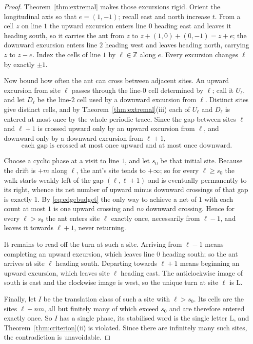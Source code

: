 \documentclass[11pt,letterpaper]{article}
\theoremstyle{plain}
\theoremstyle{definition}
\newcommand{\Z}{\mathbb{Z}}
\newcommand{\turnL}{\mathrm{L}}
\begin{document}
\begin{NoHyper}
\begin{proof}
Theorem~\ref{thm:extremal} makes those excursions rigid. Orient the longitudinal axis
so that $e=(1,-1)$; recall east and north increase $t$. From a cell $z$ on line $1$
the upward excursion
enters line $0$ heading east and leaves it heading south, so it carries the ant from
$z$ to $z+(1,0)+(0,-1)=z+e$; the downward excursion enters line $2$ heading west and
leaves heading north, carrying $z$ to $z-e$. Index the cells of line $1$ by
$\ell\in\Z$ along $e$. Every excursion changes $\ell$ by exactly $\pm1$.

Now bound how often the ant can cross between adjacent sites. An upward excursion
from site $\ell$ passes through the line-$0$ cell determined by $\ell$; call it
$U_\ell$, and let $D_\ell$ be the line-$2$ cell used by a downward excursion from
$\ell$. Distinct sites give distinct cells, and by Theorem~\ref{thm:extremal}(iii)
each of $U_\ell$ and $D_\ell$ is entered at most once by the whole periodic trace.
Since the gap between sites $\ell$ and $\ell+1$ is crossed upward only by an upward
excursion from $\ell$, and downward only by a downward excursion from $\ell+1$,
\begin{equation}\label{eq:edgebudget}
\text{each gap is crossed at most once upward and at most once downward.}
\end{equation}

Choose a cyclic phase at a visit to line $1$, and let $s_0$ be that initial site.
Because the drift is $+m$ along
$\ell$, the ant's site tends to $+\infty$; so for every $\ell\ge s_0$ the walk starts
weakly left of the gap $(\ell,\ell+1)$ and is eventually permanently to its right,
whence its net number of upward minus downward crossings of that gap is exactly $1$.
By \eqref{eq:edgebudget} the only way to achieve a net of $1$ with each count at most
$1$ is one upward crossing and \emph{no} downward crossing. Hence for every
$\ell>s_0$ the ant enters site $\ell$ exactly once, necessarily from $\ell-1$, and
leaves it towards $\ell+1$, never returning.

It remains to read off the turn at such a site. Arriving from $\ell-1$ means
completing an upward excursion, which leaves line $0$ heading south; so the ant
arrives at site $\ell$ heading south. Departing towards $\ell+1$ means beginning an
upward excursion, which leaves site $\ell$ heading east. The anticlockwise image of
south is east and the clockwise image is west, so the unique turn at site $\ell$ is
$\turnL$.

Finally, let $I$ be the translation class of such a site with $\ell>s_0$. Its cells
are the sites $\ell+nm$, all but finitely many of which exceed $s_0$ and are therefore
entered exactly once. So $I$ has a single phase, its stabilised word is the single
letter $\turnL$, and Theorem~\ref{thm:criterion}(ii) is violated. Since there are
infinitely many such sites, the contradiction is unavoidable.
\end{proof}


\end{NoHyper}
\end{document}
